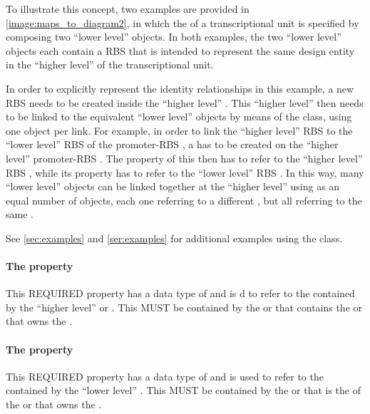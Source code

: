 To illustrate this concept, two examples are provided in \ref{image:maps_to_diagram2}, in which the  of a transcriptional unit is specified by composing two ``lower level''  objects.
In both examples, the two ``lower level''  objects each contain a RBS  that is intended to represent the same design entity in the ``higher level''  of the transcriptional unit.

In order to explicitly represent the identity relationships in this example, a new RBS  needs to be created inside the ``higher level'' .
This ``higher level''  then needs to be linked to the equivalent ``lower level''  objects by means of the  class, using one  object per link.
For example, in order to link the ``higher level'' RBS  to the ``lower level'' RBS  of the promoter-RBS , a  has to be created on the ``higher level'' promoter-RBS . The  property of this  then has to refer to the ``higher level'' RBS , while its  property has to refer to the ``lower level'' RBS .
In this way, many ``lower level''  objects can be linked together at the ``higher level'' using as an equal number of  objects, each one referring to a different  , but all referring to the same  .

See \ref{sec:examples} and \ref{ser:examples} for additional examples using the  class.

\paragraph{The  property}\label{sec:local}
This REQUIRED property has a data type of  and is 
d to refer to the  contained by the ``higher level''  or . This   MUST be contained by the  or  that contains the  or  that owns the .

\paragraph{The  property}\label{sec:remote}
This REQUIRED property has a data type of  and is used to refer to the  contained by the ``lower level'' .
This   MUST be contained by the  or  that is the  of the  or  that owns the .

